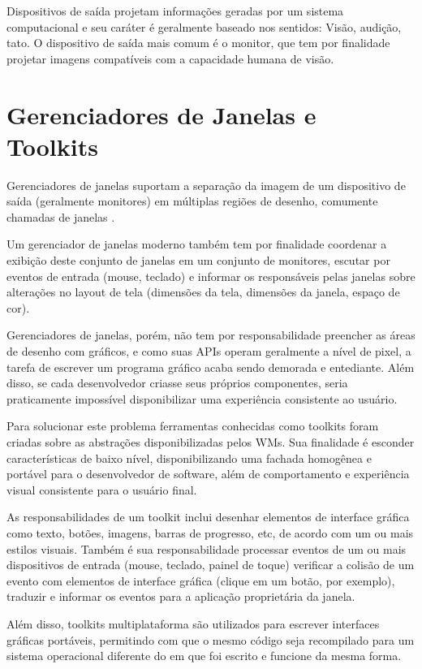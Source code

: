 Dispositivos de saída projetam informações geradas por um sistema computacional
e seu caráter é geralmente baseado nos sentidos: Visão, audição, tato. O
dispositivo de saída mais comum é o monitor, que tem por finalidade projetar
imagens compatíveis com a capacidade humana de visão.

\section{Gerenciadores de Janelas e Toolkits}

Gerenciadores de janelas suportam a separação da imagem de um dispositivo de
saída (geralmente monitores) em múltiplas regiões de desenho, comumente chamadas
de janelas  \cite[p. 5]{myers1996uimss}.

Um gerenciador de janelas moderno também tem por finalidade coordenar a exibição
deste conjunto de janelas em um conjunto de monitores, escutar por eventos de
entrada (mouse, teclado) e informar os responsáveis pelas janelas sobre
alterações no layout de tela (dimensões da tela, dimensões da janela, espaço de
cor).

Gerenciadores de janelas, porém, não tem por responsabilidade preencher as áreas
de desenho com gráficos, e como suas APIs operam geralmente a nível de pixel, a
tarefa de escrever um programa gráfico acaba sendo demorada e entediante.
 Além disso, se cada
desenvolvedor criasse seus próprios componentes, seria praticamente impossível
disponibilizar uma experiência consistente ao usuário.

Para solucionar este problema ferramentas conhecidas como toolkits foram criadas
sobre as abstrações disponibilizadas pelos WMs. Sua finalidade é esconder
características de baixo nível, disponibilizando uma fachada homogênea e
portável para o desenvolvedor de software, além de comportamento e experiência
visual consistente para o usuário final.

As responsabilidades de um toolkit inclui desenhar elementos de interface
gráfica como texto, botões, imagens, barras de progresso, etc, de acordo com um
ou mais estilos visuais. Também é sua responsabilidade processar eventos de um
ou mais dispositivos de entrada (mouse, teclado, painel de toque) verificar a
colisão de um evento com elementos de interface gráfica (clique em um botão, por
exemplo), traduzir e informar os eventos para a aplicação proprietária da
janela.

Além disso, toolkits multiplataforma são utilizados para escrever interfaces
gráficas portáveis, permitindo com que o mesmo código seja recompilado para um
sistema operacional diferente do em que foi escrito e funcione da mesma forma.

